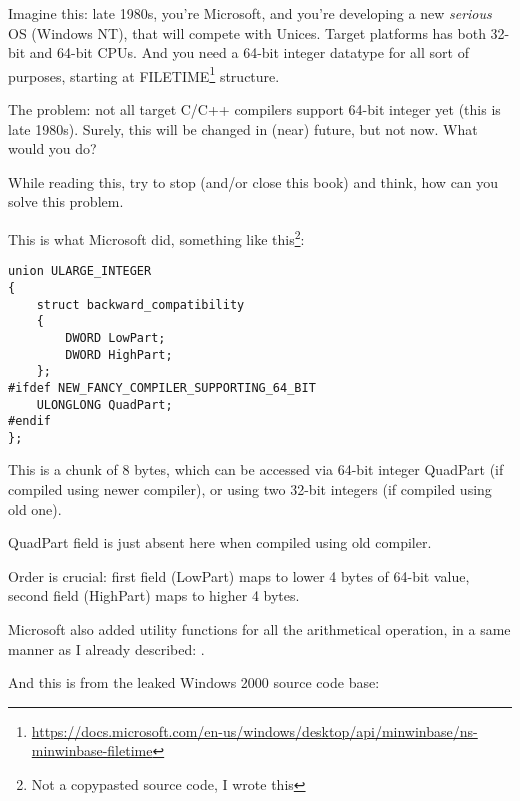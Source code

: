 \label{LargeInteger}

Imagine this: late 1980s, you're Microsoft, and you're developing a new \emph{serious} \ac{OS} (Windows NT),
that will compete with Unices.
Target platforms has both 32-bit and 64-bit CPUs.
And you need a 64-bit integer datatype for all sort of purposes, starting at
FILETIME\footnote{\url{https://docs.microsoft.com/en-us/windows/desktop/api/minwinbase/ns-minwinbase-filetime}} structure.

The problem: not all target C/C++ compilers support 64-bit integer yet (this is late 1980s).
Surely, this will be changed in (near) future, but not now.
What would you do?

While reading this, try to stop (and/or close this book) and think, how can you solve this problem.

\clearpage

This is what Microsoft did, something like this\footnote{Not a copypasted source code, I wrote this}:

\begin{lstlisting}
union ULARGE_INTEGER
{
    struct backward_compatibility
    {
        DWORD LowPart;
        DWORD HighPart;
    };
#ifdef NEW_FANCY_COMPILER_SUPPORTING_64_BIT
    ULONGLONG QuadPart;
#endif
};
\end{lstlisting}

This is a chunk of 8 bytes, which can be accessed via 64-bit integer QuadPart (if compiled using newer compiler),
or using two 32-bit integers (if compiled using old one).

QuadPart field is just absent here when compiled using old compiler.

Order is crucial: first field (LowPart) maps to lower 4 bytes of 64-bit value, second field (HighPart) maps to higher 4 bytes.

Microsoft also added utility functions for all the arithmetical operation, in a same manner as I already described:
.

And this is from the leaked Windows 2000 source code base:

